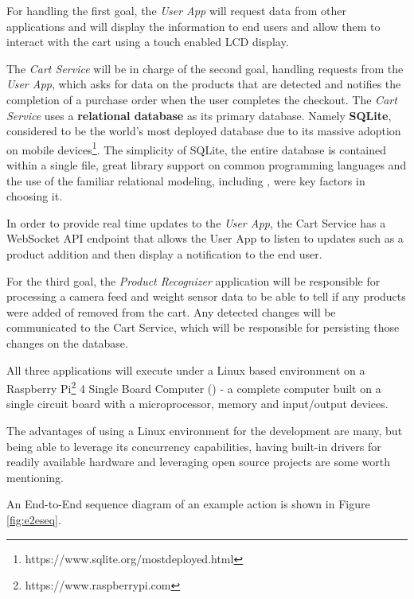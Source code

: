 For handling the first goal, the \textit{User App} will request data
from other applications and will display the information to end users and allow
them to interact with the cart using a touch enabled LCD display. 

The \textit{Cart Service} will be in charge of the second goal,
handling requests from the \textit{User App}, which asks for data 
on the products that are detected and notifies the completion of a purchase order 
when the user completes the checkout. The \textit{Cart Service} uses a
\textbf{relational database} \cite{Silberschatz2010} as its primary database. Namely
\textbf{SQLite}, considered to be the world's most deployed database due to its
massive adoption on mobile
devices\footnote{https://www.sqlite.org/mostdeployed.html}. The simplicity of
SQLite, the entire database is contained within a single file, great
library support on common programming languages and the use of the familiar
relational modeling, including 
\cite{Nield2016}, were key factors in choosing it.

In order to provide real time updates to the \textit{User App}, the Cart Service has a
WebSocket API endpoint that allows the User App to listen to updates such as a product addition
and then display a notification to the end user.

For the third goal, the \textit{Product Recognizer} application will be responsible
for processing a camera feed and weight sensor data to be able to tell if any products
were added of removed from the cart. Any detected changes will be communicated to the
Cart Service, which will be responsible for persisting those changes on the database. 

All three applications will execute under a Linux \cite{Tanenbaum2015} 
based environment on a Raspberry Pi\footnote{https://www.raspberrypi.com} 4 Single Board
Computer () - a complete computer built on a single 
circuit board with a microprocessor, memory and input/output devices.

The advantages of using a Linux environment for the development are many, but
being able to leverage its concurrency capabilities, having built-in drivers
for readily available hardware and leveraging open source projects are some 
worth mentioning.

An End-to-End sequence diagram of an example action is shown in Figure \ref{fig:e2eseq}.

